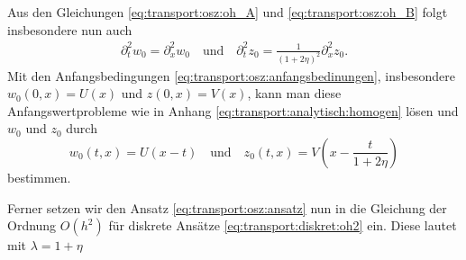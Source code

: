 Aus den Gleichungen \eqref{eq:transport:osz:oh_A} und \eqref{eq:transport:osz:oh_B} folgt insbesondere nun auch
\begin{align}\label{alt:abl2}
\partial^2_t w_0 = \partial^2_x w_0 \quad \text{und} \quad \partial^2_t z_0 = \frac {1}{(1 + 2 \eta)^2} \partial^2_x z_0.
\end{align}
Mit den Anfangsbedingungen \eqref{eq:transport:osz:anfangsbedinungen}, insbesondere $w_0(0, x) = U(x)$ und $z(0, x) = V(x)$, kann man diese Anfangswertprobleme wie in Anhang \ref{eq:transport:analytisch:homogen} lösen und $w_0$ und $z_0$ durch
\[ w_0(t,x) = U(x-t) \quad \text{und} \quad z_0(t,x) = V\left( x - \frac{t}{1 + 2 \eta} \right) \]
bestimmen.

Ferner setzen wir den Ansatz \eqref{eq:transport:osz:ansatz} nun in die Gleichung der Ordnung $O(h^2)$ für diskrete Ansätze \eqref{eq:transport:diskret:oh2} ein.
Diese lautet mit $\lambda = 1 + \eta$

